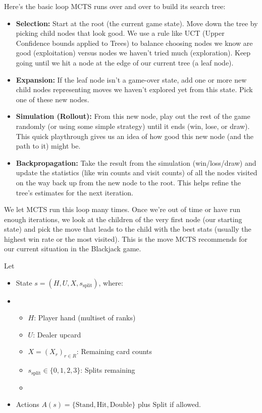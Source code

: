 \documentclass[12pt,a4paper]{cibb}
\begin{document}
Here’s the basic loop MCTS runs over and over to build its search tree:

\begin{itemize}
    \item \textbf{Selection:} Start at the root (the current game state). Move down the tree by picking child nodes that look good. We use a rule like UCT (Upper Confidence bounds applied to Trees) to balance choosing nodes we know are good (exploitation) versus nodes we haven't tried much (exploration). Keep going until we hit a node at the edge of our current tree (a leaf node).
    \item \textbf{Expansion:} If the leaf node isn't a game-over state, add one or more new child nodes representing moves we haven't explored yet from this state. Pick one of these new nodes.
    \item \textbf{Simulation (Rollout):} From this new node, play out the rest of the game randomly (or using some simple strategy) until it ends (win, lose, or draw). This quick playthrough gives us an idea of how good this new node (and the path to it) might be.
    \item \textbf{Backpropagation:} Take the result from the simulation (win/loss/draw) and update the statistics (like win counts and visit counts) of all the nodes visited on the way back up from the new node to the root. This helps refine the tree's estimates for the next iteration.
\end{itemize}

We let MCTS run this loop many times. Once we're out of time or have run enough iterations, we look at the children of the very first node (our starting state) and pick the move that leads to the child with the best stats (usually the highest win rate or the most visited). This is the move MCTS recommends for our current situation in the Blackjack game.

Let
\begin{itemize}
    \item State \(s=(H, U, X, s_{\mathrm{split}})\), where:
    \item \begin{itemize}[leftmargin=1.5cm]
\item \(H\): Player hand (multiset of ranks)
\item \(U\): Dealer up\-card
\item \(X=(X_r)_{r\in R}\): Remaining card counts
\item \(s_{\mathrm{split}}\in\{0,1,2,3\}\): Splits remaining
    \item \end{itemize}
    \item Actions \(A(s)=\{\mathrm{Stand},\mathrm{Hit},\mathrm{Double}\}\) plus \(\mathrm{Split}\) if allowed.
\end{itemize}
\end{document}
